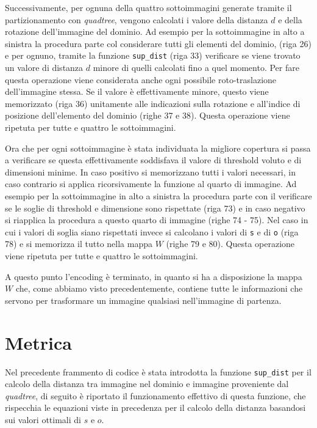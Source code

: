 \documentclass[11pt,a4paper,appendixprefix=true,numbers=noenddot]{scrreprt}
\begin{document}
Successivamente, per ognuna della quattro sottoimmagini generate tramite il partizionamento con \textit{quadtree}, vengono calcolati i valore della distanza $d$ e della rotazione dell'immagine del dominio. Ad esempio per la sottoimmagine in alto a sinistra la procedura parte col considerare tutti gli elementi del dominio, (riga 26) e per ognuno, tramite la funzione \texttt{sup\_dist} (riga 33) verificare se viene trovato un valore di distanza $d$ minore di quelli calcolati fino a quel momento. Per fare questa operazione viene considerata anche ogni possibile roto-traslazione dell'immagine stessa. Se il valore è effettivamente minore, questo viene memorizzato (riga 36) unitamente alle indicazioni sulla rotazione e all'indice di posizione dell'elemento del dominio (righe 37 e 38). Questa operazione viene ripetuta per tutte e quattro le sottoimmagini.

Ora che per ogni sottoimmagine è stata individuata la migliore copertura si passa a verificare se questa effettivamente soddisfava il valore di threshold voluto e di dimensioni minime. In caso positivo si memorizzano tutti i valori necessari, in caso contrario si applica ricorsivamente la funzione al quarto di immagine. Ad esempio per la sottoimmagine in alto a sinistra la procedura parte con il verificare se le soglie di threshold e dimensione sono rispettate (riga 73) e in caso negativo si riapplica la procedura a questo quarto di immagine (righe 74 - 75). Nel caso in cui i valori di soglia siano rispettati invece si calcolano i valori di \texttt{s} e di \texttt{o} (riga 78) e si memorizza il tutto nella mappa $W$ (righe 79 e 80).  Questa operazione viene ripetuta per tutte e quattro le sottoimmagini.

A questo punto l'encoding è terminato, in quanto si ha a disposizione la mappa $W$ che, come abbiamo visto precedentemente, contiene tutte le informazioni che servono per trasformare un immagine qualsiasi nell'immagine di partenza.

\section{Metrica}

Nel precedente frammento di codice è stata introdotta la funzione \texttt{sup\_dist} per il calcolo della distanza tra immagine nel dominio e immagine proveniente dal \textit{quadtree}, di seguito è riportato il funzionamento effettivo di questa funzione, che rispecchia le equazioni viste in precedenza per il calcolo della distanza basandosi sui valori ottimali di $s$ e $o$.
\end{document}
